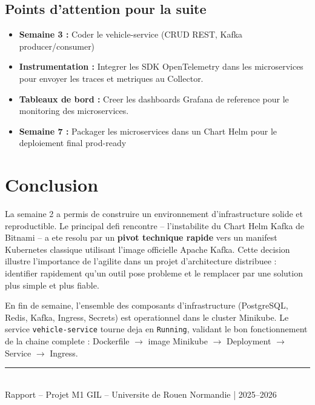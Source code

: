 \documentclass[12pt,a4paper]{article}
\begin{document}
\subsection{Points d'attention pour la suite}

\begin{itemize}
  \item \textbf{Semaine 3 :} Coder le vehicle-service (CRUD REST, Kafka producer/consumer)
  \item \textbf{Instrumentation :} Integrer les SDK OpenTelemetry dans les microservices pour envoyer les traces et metriques au Collector.
  \item \textbf{Tableaux de bord :} Creer les dashboards Grafana de reference pour le monitoring des microservices.
  \item \textbf{Semaine 7 :} Packager les microservices dans un Chart Helm pour le deploiement final prod-ready
\end{itemize}

\section{Conclusion}

La semaine 2 a permis de construire un environnement d'infrastructure solide et
reproductible. Le principal defi rencontre -- l'instabilite du Chart Helm Kafka de
Bitnami -- a ete resolu par un \textbf{pivot technique rapide} vers un manifest
Kubernetes classique utilisant l'image officielle Apache Kafka. Cette decision illustre
l'importance de l'agilite dans un projet d'architecture distribuee : identifier rapidement
qu'un outil pose probleme et le remplacer par une solution plus simple et plus fiable.

En fin de semaine, l'ensemble des composants d'infrastructure (PostgreSQL, Redis, Kafka,
Ingress, Secrets) est operationnel dans le cluster Minikube. Le service
\texttt{vehicle-service} tourne deja en \texttt{Running}, validant le bon fonctionnement
de la chaine complete : Dockerfile $\rightarrow$ image Minikube $\rightarrow$ Deployment
$\rightarrow$ Service $\rightarrow$ Ingress.

\vspace{1cm}
\begin{center}
\rule{0.5\linewidth}{0.4pt}\\[0.3cm]
{\small Rapport -- Projet M1 GIL -- Universite de Rouen Normandie | 2025--2026}
\end{center}
\end{document}
